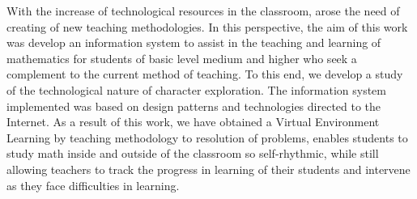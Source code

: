 With the increase of technological resources in the classroom, arose the need of creating 
of new teaching methodologies. In this perspective, the aim of this work was 
develop an information system to assist in the teaching and learning of mathematics 
for students of basic level medium and higher who seek a complement to the current method of teaching. 
To this end, we develop a study of the technological nature of character exploration. 
The information system implemented was based on design patterns and technologies 
directed to the Internet. As a result of this work, we have obtained a Virtual Environment 
Learning by teaching methodology to resolution of problems, enables students to study math inside and outside of the classroom so self-rhythmic, while still allowing teachers to track the progress in learning of their students and intervene as they face difficulties in learning.

